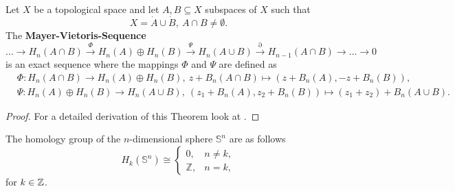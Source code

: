 \begin{thm}\label{thm:mvs}
  Let $X$ be a topological space and let $A, B \subseteq X$ subspaces of $X$ such that \[X = \dot{A} \cup \dot{B}, \: A \cap B \neq \emptyset.\]
  The \textbf{Mayer-Vietoris-Sequence}
  \begin{equation*}
    \ldots \to H_n(A\cap B) \overset{\Phi}{\to} H_n(A) \oplus H_n(B) \overset{\Psi}{\to} H_n(A \cup B) \overset{\partial}{\to} H_{n-1}(A\cap B) \to \ldots \to 0
  \end{equation*}
  is an exact sequence where the mappings $\Phi$ and $\Psi$ are defined as
  \begin{align*}
    &\Phi\colon H_n(A\cap B) \to H_n(A) \oplus H_n(B),\: z + B_n(A\cap B) \mapsto (z+B_n(A), -z + B_n(B)), \\
    &\Psi\colon H_n(A) \oplus H_n(B) \to H_n(A\cup B), \: (z_1+ B_n(A), z_2 + B_n(B)) \mapsto (z_1 + z_2) + B_n(A \cup B).
  \end{align*}
\end{thm}

\begin{proof}
  For a detailed derivation of this Theorem look at \cite[p. 149]{hatcher}. 
\end{proof}

\begin{ex}
  The homology group of the $n$-dimensional sphere $\mathbb{S}^n$ are as follows
  \begin{equation*}
    H_k(\mathbb{S}^n) \cong \begin{cases}
      0, &n \neq k, \\
      \mathbb{Z}, &n = k,
    \end{cases}
  \end{equation*}
  for $k \in \mathbb{Z}$.
\end{ex}

